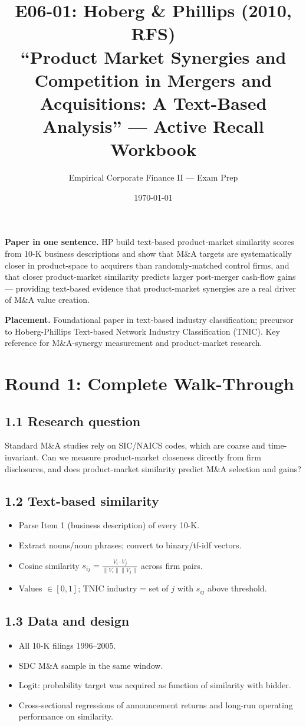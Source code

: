 \documentclass[11pt]{article}
\title{E06-01: Hoberg \& Phillips (2010, RFS) \\
\large ``Product Market Synergies and Competition in Mergers and Acquisitions: A Text-Based Analysis'' --- Active Recall Workbook}
\author{Empirical Corporate Finance II --- Exam Prep}
\date{\today}
\begin{document}
\maketitle

\begin{keybox}
\textbf{Paper in one sentence.} HP build text-based product-market similarity scores from 10-K business descriptions and show that M\&A targets are systematically closer in product-space to acquirers than randomly-matched control firms, and that closer product-market similarity predicts larger post-merger cash-flow gains --- providing text-based evidence that product-market synergies are a real driver of M\&A value creation.

\textbf{Placement.} Foundational paper in text-based industry classification; precursor to Hoberg-Phillips Text-based Network Industry Classification (TNIC). Key reference for M\&A-synergy measurement and product-market research.
\end{keybox}

\section*{Round 1: Complete Walk-Through}

\subsection*{1.1 Research question}
Standard M\&A studies rely on SIC/NAICS codes, which are coarse and time-invariant. Can we measure product-market closeness directly from firm disclosures, and does product-market similarity predict M\&A selection and gains?

\subsection*{1.2 Text-based similarity}
\begin{itemize}
\item Parse Item 1 (business description) of every 10-K.
\item Extract nouns/noun phrases; convert to binary/tf-idf vectors.
\item Cosine similarity $s_{ij}=\frac{V_i\cdot V_j}{\|V_i\|\|V_j\|}$ across firm pairs.
\item Values $\in[0,1]$; TNIC industry = set of $j$ with $s_{ij}$ above threshold.
\end{itemize}

\subsection*{1.3 Data and design}
\begin{itemize}
\item All 10-K filings 1996--2005.
\item SDC M\&A sample in the same window.
\item Logit: probability target was acquired as function of similarity with bidder.
\item Cross-sectional regressions of announcement returns and long-run operating performance on similarity.
\end{itemize}
\end{document}
